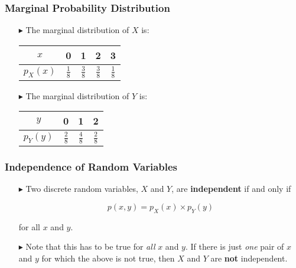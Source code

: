 \documentclass[12pt]{beamer}
\begin{document}
\begin{frame}
	\frametitle{Marginal Probability Distribution}
	
	\begin{itemize}
		\item[\color{blue}$\blacktriangleright$]The marginal distribution of $X$ is:
		
			\begin{center}
			\begin{tabular}{ccccc}
				\toprule
				$x$&0&1&2&3\\
				\toprule
				$p_X(x)$&$\frac{1}{8}$&$\frac{3}{8}$&$\frac{3}{8}$&$\frac{1}{8}$\\
				\bottomrule
			\end{tabular}
		\end{center}
		
		\item[\color{blue}$\blacktriangleright$]The marginal distribution of $Y$ is:
		
		\begin{center}
			\begin{tabular}{cccc}
				\toprule
				$y$&0&1&2\\
				\toprule
				$p_Y(y)$&$\frac{2}{8}$&$\frac{4}{8}$&$\frac{2}{8}$\\
				\bottomrule
			\end{tabular}
		\end{center}
		
	\end{itemize}
	
\end{frame}

\begin{frame}
	\frametitle{Independence of Random Variables}
	
	\begin{itemize}
		\item[\color{blue}$\blacktriangleright$]Two discrete random variables, $X$ and $Y$, are \textbf{independent} if and only if
		
		\[
		p(x,y) = p_X(x) \times p_Y(y)
		\]
		
		for all $x$ and $y$.
		
		\item[\color{blue}$\blacktriangleright$]Note that this has to be true for \emph{all} $x$ and $y$. If there is just \emph{one} pair of $x$ and $y$ for which the above is not true, then $X$ and $Y$ are \textbf{not} independent.
		
	\end{itemize}
	
\end{frame}
\end{document}
